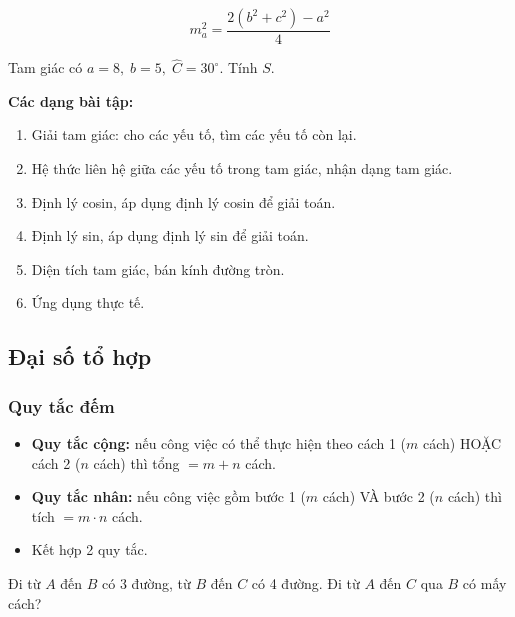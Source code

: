 \documentclass[12pt,a4paper]{article}
\begin{document}
\begin{congthuc}[title={Công thức trung tuyến}]
  \[
    m_a^2 = \dfrac{2(b^2 + c^2) - a^2}{4}
  \]
\end{congthuc}

\begin{vidu}
  Tam giác có $a = 8,\; b = 5,\; \widehat{C} = 30^\circ$. Tính $S$.
\end{vidu}

\medskip\noindent\textbf{Các dạng bài tập:}
\begin{enumerate}[label=\textbf{Dạng \arabic*:}, leftmargin=*, align=left]
  \item Giải tam giác: cho các yếu tố, tìm các yếu tố còn lại.
  \item Hệ thức liên hệ giữa các yếu tố trong tam giác, nhận dạng tam giác.
  \item Định lý cosin, áp dụng định lý cosin để giải toán.
  \item Định lý sin, áp dụng định lý sin để giải toán.
  \item Diện tích tam giác, bán kính đường tròn.
  \item Ứng dụng thực tế.
\end{enumerate}

\subsection{Đại số tổ hợp}

\subsubsection{Quy tắc đếm}

\begin{dinhnghia}
  \begin{itemize}
    \item \textbf{Quy tắc cộng:} nếu công việc có thể thực hiện theo cách 1 ($m$ cách) HOẶC cách 2 ($n$ cách) thì tổng $= m + n$ cách.
    \item \textbf{Quy tắc nhân:} nếu công việc gồm bước 1 ($m$ cách) VÀ bước 2 ($n$ cách) thì tích $= m \cdot n$ cách.
    \item Kết hợp 2 quy tắc.
  \end{itemize}
\end{dinhnghia}

\begin{vidu}
  Đi từ $A$ đến $B$ có 3 đường, từ $B$ đến $C$ có 4 đường. Đi từ $A$ đến $C$ qua $B$ có mấy cách?
\end{vidu}
\end{document}
